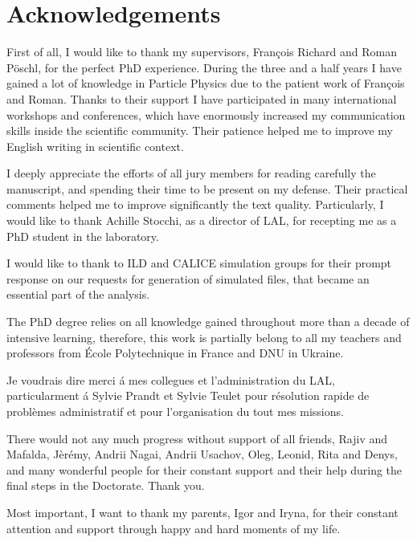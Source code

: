 \section*{Acknowledgements}
First of all, I would like to thank my supervisors, Fran\c cois Richard and Roman P\"oschl, for the perfect PhD experience. 
During the three and a half years I have gained a lot of knowledge in Particle Physics due to the patient work of Fran\c cois and Roman. 
Thanks to their support I have participated in many international workshops and conferences, which have enormously increased my communication skills inside the scientific community. 
Their patience helped me to improve my English writing in scientific context. 


I deeply appreciate the efforts of all jury members for reading carefully the manuscript, and spending their time to be present on my defense. Their practical comments helped me to improve significantly the text quality. 
Particularly, I would like to thank Achille Stocchi, as a director of LAL, for  recepting me as a PhD student in the laboratory.

I would like to thank to ILD and CALICE simulation groups for their prompt response on our requests for generation of simulated files, that became an essential part of the analysis. 

The PhD degree relies on all knowledge gained throughout more than a decade of intensive learning, therefore, this work is partially belong to all my teachers and professors from \'Ecole Polytechnique in France and DNU in Ukraine. 

Je voudrais dire merci \'a mes collegues et l'administration du LAL, particularment \'a Sylvie Prandt et Sylvie Teulet pour résolution rapide de problèmes administratif et pour l'organisation du tout mes missions.

There would not any much progress without support of all friends, Rajiv and Mafalda, J\`er\'emy, Andrii Nagai, Andrii Usachov, Oleg, Leonid, Rita and Denys, and many wonderful people for their constant support and their help during the final steps in the Doctorate. Thank you. 

Most important, I want to thank my parents, Igor and Iryna, for their constant attention and support through happy and hard moments of my life.  